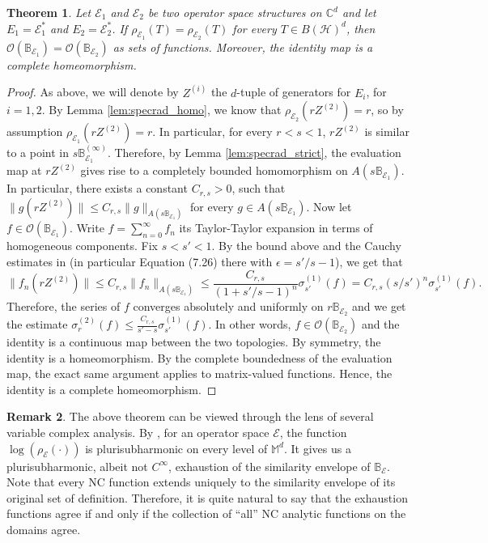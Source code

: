 \documentclass[12pt]{amsart}
\numberwithin{equation}{section}
\newtheorem{theorem}{Theorem}[section]
\theoremstyle{definition}
\newtheorem{remark}[theorem]{Remark}
\newcommand{\cE}{\mathcal{E}}
\newcommand{\cH}{\mathcal{H}}
\newcommand{\cO}{\mathcal{O}}
\newcommand{\bB}{\mathbb{B}}
\newcommand{\C}{\mathbb{C}}
\newcommand{\bM}{\mathbb{M}}
\begin{document}
\begin{theorem}\label{thm:spr_OBE}
    Let $\cE_1$ and $\cE_2$ be two operator space structures on $\C^d$ and let $E_1 = \cE_1^*$ and $E_2 = \cE_2^*$. If $\rho_{\cE_1}(T) = \rho_{\cE_2}(T)$ for every $T \in B(\cH)^d$, then $\cO(\bB_{\cE_1}) = \cO(\bB_{\cE_2})$ as sets of functions. Moreover, the identity map is a complete homeomorphism. 
\end{theorem}
\begin{proof}
    As above, we will denote by $Z^{(i)}$ the $d$-tuple of generators for $E_i$, for $i = 1,2$. By Lemma \ref{lem:specrad_homo}, we know that $\rho_{\cE_2}(r Z^{(2 )}) = r$, so by assumption $\rho_{\cE_1}(r Z^{(2)}) = r$. In particular, for every $r < s < 1$, $r Z^{(2)}$ is similar to a point in $s \bB^{(\infty)}_{\cE_1}$. Therefore, by Lemma \ref{lem:specrad_strict}, the evaluation map at $r Z^{(2)}$ gives rise to a completely bounded homomorphism on $A(s \bB_{\cE_1})$. In particular, there exists a constant $C_{r,s} > 0$, such that $\|g(r Z^{(2)})\| \leq C_{r,s} \|g\|_{A(s \bB_{\cE_1})}$ for every $g \in A(s \bB_{\cE_1})$. Now let $f \in \cO(\bB_{\cE_1})$. Write $f = \sum_{n=0}^{\infty} f_n$ its Taylor-Taylor expansion in terms of homogeneous components. Fix $s < s' < 1$. By the bound above and the Cauchy estimates in \cite[Theorem 7.21]{KVV} (in particular Equation (7.26) there with $\epsilon = s'/s - 1$), we get that
    \[
    \|f_n(r Z^{(2)})\| \leq C_{r,s} \|f_n\|_{A(s\bB_{\cE_1})} \leq \frac{C_{r,s}}{(1+s'/s - 1)^n} \sigma_{s'}^{(1)}(f) = C_{r,s} (s/s')^n \sigma_{s'}^{(1)}(f).
    \]
    Therefore, the series of $f$ converges absolutely and uniformly on $r \bB_{\cE_2}$ and we get the estimate $\sigma_r^{(2)}(f) \leq \frac{C_{r,s}}{s' - s} \sigma^{(1)}_{s'}(f)$. In other words, $f \in \cO(\bB_{\cE_2})$ and the identity is a continuous map between the two topologies. By symmetry, the identity is a homeomorphism. By the complete boundedness of the evaluation map, the exact same argument applies to matrix-valued functions. Hence, the identity is a complete homeomorphism.
\end{proof}

\begin{remark}
    The above theorem can be viewed through the lens of several variable complex analysis. By \cite{shalsham2025spectral}, for an operator space $\cE$, the function $\log(\rho_{\cE}(\cdot))$ is plurisubharmonic on every level of $\bM^d$. It gives us a plurisubharmonic, albeit not $C^{\infty}$, exhaustion of the similarity envelope of $\bB_{\cE}$. Note that every NC function extends uniquely to the similarity envelope of its original set of definition. Therefore, it is quite natural to say that the exhaustion functions agree if and only if the collection of ``all'' NC analytic functions on the domains agree.
\end{remark}
\end{document}
